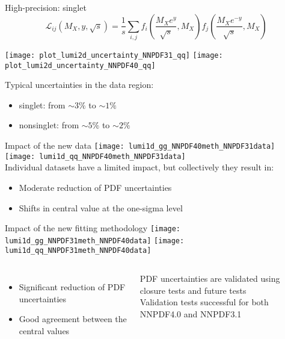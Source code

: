 \begin{frame}[t]{High-precision: singlet }
  \begin{equation*}
  \mathcal{L}_{i j}\left(M_{X}, y, \sqrt{s}\right)
  =\frac{1}{s} \sum_{i, j} f_{i}\left(\frac{M_{X} e^{y}}{\sqrt{s}}, M_{X}\right) f_{j}\left(\frac{M_{X} e^{-y}}{\sqrt{s}}, M_{X}\right)
  \end{equation*}
  \begin{center}
    \texttt{[image: plot\_lumi2d\_uncertainty\_NNPDF31\_qq]}
    \texttt{[image: plot\_lumi2d\_uncertainty\_NNPDF40\_qq]}\\
  \end{center}
  Typical uncertainties in the data region:
  \begin{itemize}
    \item singlet: from $\sim 3\%$ to $\sim 1\%$
    \item nonsinglet: from $\sim 5\%$ to $\sim 2\%$
  \end{itemize}
\end{frame}


\begin{frame}[t]{Impact of the new data}
  \texttt{[image: lumi1d\_gg\_NNPDF40meth\_NNPDF31data]}
  \texttt{[image: lumi1d\_qq\_NNPDF40meth\_NNPDF31data]}\\
  Individual datasets have a limited impact, but collectively they result in:
  \begin{itemize}
      \item Moderate reduction of PDF uncertainties
      \item Shifts in central value at the one-sigma level
  \end{itemize}
\end{frame}


\begin{frame}[t]{Impact of the new fitting methodology}
  \texttt{[image: lumi1d\_gg\_NNPDF31meth\_NNPDF40data]}
  \texttt{[image: lumi1d\_qq\_NNPDF31meth\_NNPDF40data]}
  \begin{columns}
      \begin{itemize}
                \item Significant reduction of PDF uncertainties
            \item Good agreement between the central values
        \end{itemize}
            \begin{block}{}
                \fontsize{7}{6}\selectfont
                PDF uncertainties are validated using closure tests and future tests\\
                Validation tests successful for both NNPDF4.0 and NNPDF3.1
            \end{block}
    \end{columns}
\end{frame}

